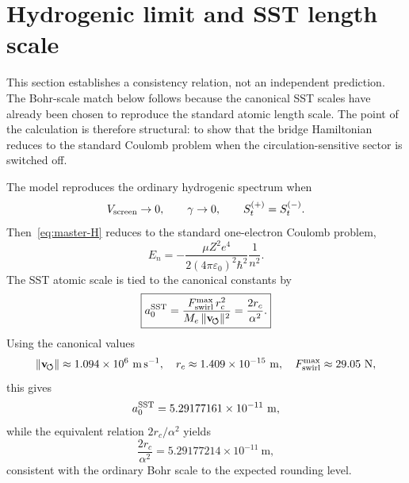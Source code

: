 \documentclass[11pt,a4paper]{article}
\newcommand{\rc}{r_c}
\begin{document}
    \section{Hydrogenic limit and SST length scale}
    \label{sec:hydrogenic}
    This section establishes a consistency relation, not an independent prediction. The Bohr-scale match below follows because the canonical SST scales have already been chosen to reproduce the standard atomic length scale. The point of the calculation is therefore structural: to show that the bridge Hamiltonian reduces to the standard Coulomb problem when the circulation-sensitive sector is switched off.
    
    The model reproduces the ordinary hydrogenic spectrum when
    \begin{equation}
        V_{\rm screen}\to 0,
        \qquad
        \gamma\to 0,
        \qquad
        S_t^{(+)}=S_t^{(-)}.
    \end{equation}
    Then~\eqref{eq:master-H} reduces to the standard one-electron Coulomb problem,
    \begin{equation}
        \label{eq:En}
        E_n=-\frac{\mu Z^2 e^4}{2(4\pi\varepsilon_0)^2\hbar^2}\frac{1}{n^2}.
    \end{equation}
    The SST atomic scale is tied to the canonical constants by
    \begin{equation}
        \label{eq:a0-sst}
        \boxed{
            a_0^{\rm SST}
            =
            \frac{F_{\rm swirl}^{\max}\,\rc^2}{M_e\,\lVert\mathbf{v}_{\!\boldsymbol{\circlearrowleft}}\rVert^2}
            =
            \frac{2\rc}{\alpha^2}.
        }
    \end{equation}
    Using the canonical values
    \begin{equation}
        \lVert\mathbf{v}_{\!\boldsymbol{\circlearrowleft}}\rVert \approx 1.094\times 10^6\ \mathrm{m\,s^{-1}},
        \quad
        \rc \approx 1.409\times 10^{-15}\ \mathrm{m},
        \quad
        F_{\rm swirl}^{\max}\approx 29.05\ \mathrm{N},
    \end{equation}
    this gives
    \begin{equation}
        \label{eq:a0-num}
        a_0^{\rm SST}
        =
        5.29177161\times 10^{-11}\ \mathrm{m},
    \end{equation}
    while the equivalent relation $2\rc/\alpha^2$ yields
    \begin{equation}
        \label{eq:a0-num2}
        \frac{2\rc}{\alpha^2}=5.29177214\times 10^{-11}\ \mathrm{m},
    \end{equation}
    consistent with the ordinary Bohr scale to the expected rounding level.
    
\end{document}
